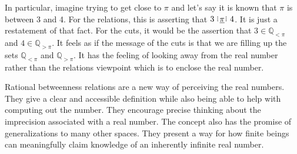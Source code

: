 \documentclass[12pt]{article}
\newcommand{\qcut}[2][x]{\ensuremath{\mathbb{Q}_{#2 #1}}}
\newcommand{\qlt}[1][x]{\qcut[#1]{<}}
\newcommand{\qgt}[1][x]{\qcut[#1]{>}}
\begin{document}
In particular, imagine trying to get close to $\pi$ and let's say it is known that $\pi$ is between 3 and 4. For the relations, this is asserting that $3 \xrel[\pi] 4$. It is just a restatement of that fact. For the cuts, it would be the assertion that $3 \in \qlt[\pi]$ and $4 \in \qgt[\pi]$. It feels as if the message of the cuts is that we are filling up the sets $\qlt[\pi]$ and $\qgt[\pi]$. It has the feeling of looking away from the real number rather than the relations viewpoint which is to enclose the real number. 

Rational betweenness relations are a new way of perceiving the real numbers. They give a clear and accessible definition while also being able to help with computing out the number. They encourage precise thinking about the imprecision associated with a real number. The concept also has the promise of generalizations to many other spaces. They present a way for how finite beings can meaningfully claim knowledge of an inherently infinite real number. 


\medskip

\normalem %
\printbibliography
\end{document}
